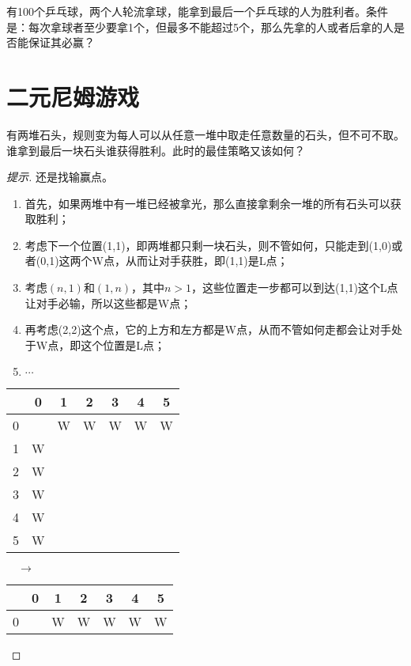 \begin{question}
  有100个乒乓球，两个人轮流拿球，能拿到最后一个乒乓球的人为胜利者。条件是：每次拿球者至少要拿1个，但最多不能超过5个，那么先拿的人或者后拿的人是否能保证其必赢？
\end{question}

\section{二元尼姆游戏}
\label{sec:two-piles-nim-game}

\begin{example}
  有两堆石头，规则变为每人可以从任意一堆中取走任意数量的石头，但不可不取。谁拿到最后一块石头谁获得胜利。此时的最佳策略又该如何？
\end{example}
\begin{proof}[提示]
  还是找输赢点。
  \begin{enumerate}
  \item 首先，如果两堆中有一堆已经被拿光，那么直接拿剩余一堆的所有石头可以获取胜利；
  \item 考虑下一个位置(1,1)，即两堆都只剩一块石头，则不管如何，只能走到(1,0)或者(0,1)这两个W点，从而让对手获胜，即(1,1)是L点；
  \item 考虑$(n,1)$和$(1,n)$，其中$n>1$，这些位置走一步都可以到达(1,1)这个L点让对手必输，所以这些都是W点；
  \item 再考虑(2,2)这个点，它的上方和左方都是W点，从而不管如何走都会让对手处于W点，即这个位置是L点；
  \item $\cdots$
  \end{enumerate}
  \begin{center}
    \begin{tabular}{|c|c|c|c|c|c|c|}
      \hline
        & 0 & 1 & 2 & 3 & 4 & 5\\\hline
      0 &   & W & W & W & W & W\\\hline
      1 & W &   &   &   &   &  \\\hline
      2 & W &   &   &   &   &  \\\hline
      3 & W &   &   &   &   &  \\\hline
      4 & W &   &   &   &   &  \\\hline
      5 & W &   &   &   &   &  \\\hline
    \end{tabular}
    $\quad\to\quad$
    \begin{tabular}{|c|c|c|c|c|c|c|}
      \hline
        & 0 & 1 & 2 & 3 & 4 & 5\\\hline
      0 &   & W & W & W & W & W\\\hline

\end{tabular}
\end{center}
\end{proof}
